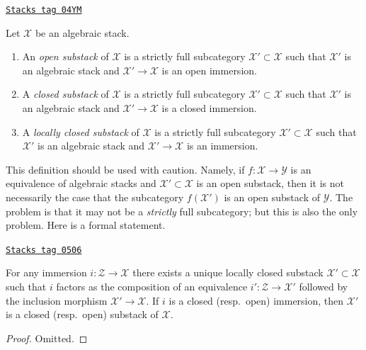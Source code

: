 \begin{definition}[Substacks]
\label{stacks-properties-definition-substacks}
\href{https://stacks.math.columbia.edu/tag/04YM}{\texttt{Stacks tag 04YM}}

Let $\mathcal{X}$ be an algebraic stack.
\begin{enumerate}
\item An {\it open substack} of $\mathcal{X}$ is a strictly full subcategory
$\mathcal{X}' \subset \mathcal{X}$ such that $\mathcal{X}'$ is an algebraic
stack and $\mathcal{X}' \to \mathcal{X}$ is an open immersion.
\item A {\it closed substack} of $\mathcal{X}$ is a strictly full subcategory
$\mathcal{X}' \subset \mathcal{X}$ such that $\mathcal{X}'$ is an algebraic
stack and $\mathcal{X}' \to \mathcal{X}$ is a closed immersion.
\item A {\it locally closed substack} of $\mathcal{X}$ is a strictly full
subcategory $\mathcal{X}' \subset \mathcal{X}$ such that $\mathcal{X}'$
is an algebraic stack and $\mathcal{X}' \to \mathcal{X}$ is an immersion.
\end{enumerate}
\end{definition}

This definition should be used with caution. Namely, if
$f : \mathcal{X} \to \mathcal{Y}$ is an equivalence of algebraic stacks
and $\mathcal{X}' \subset \mathcal{X}$ is an open substack, then it
is not necessarily the case that the subcategory $f(\mathcal{X}')$
is an open substack of $\mathcal{Y}$. The problem is that it may not
be a {\it strictly} full subcategory; but this is also the only problem.
Here is a formal statement.

\begin{lemma}
\label{stacks-properties-lemma-substack-image}
\href{https://stacks.math.columbia.edu/tag/0506}{\texttt{Stacks tag 0506}}

For any immersion $i : \mathcal{Z} \to \mathcal{X}$ there exists a
unique locally closed substack $\mathcal{X}' \subset \mathcal{X}$
such that $i$ factors as the composition of
an equivalence $i' : \mathcal{Z} \to \mathcal{X}'$
followed by the inclusion morphism $\mathcal{X}' \to \mathcal{X}$.
If $i$ is a closed (resp.\ open) immersion, then $\mathcal{X}'$
is a closed (resp.\ open) substack of $\mathcal{X}$.
\end{lemma}

\begin{proof}
Omitted.
\end{proof}


